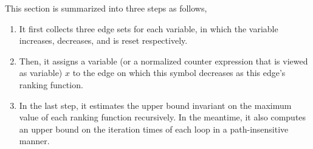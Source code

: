 This section is summarized into three steps as follows,
\begin{enumerate}
 \item It first collects three edge sets for each variable,
 in which the variable increases, decreases, and is reset respectively.
 \item
 Then, it assigns a variable (or a normalized counter expression that is viewed as variable) $x$ to the edge on which this symbol decreases as this edge's ranking function.
 \item
 In the last step, it estimates the upper bound invariant on the maximum value of each ranking function recursively.
 In the meantime, it also computes an upper bound on the iteration times of each loop in a path-insensitive manner.
 \end{enumerate}

